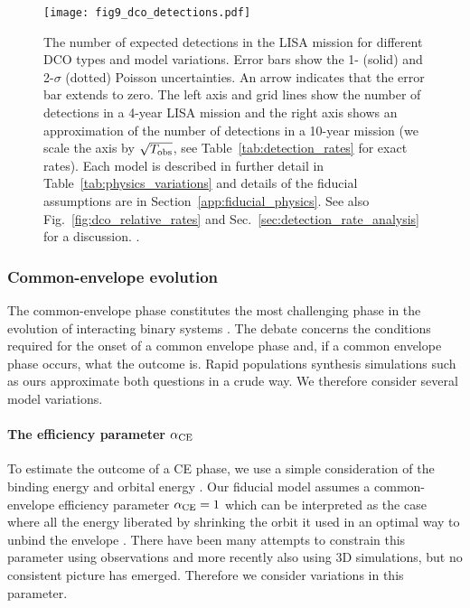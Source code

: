 \begin{figure*}[p]
    \centering
    \texttt{[image: fig9\_dco\_detections.pdf]}
    \caption{The number of expected detections in the LISA mission for different DCO types and model variations. Error bars show the 1- (solid) and 2-$\sigma$ (dotted) Poisson uncertainties. An arrow indicates that the error bar extends to zero. The left axis and grid lines show the number of detections in a 4-year LISA mission and the right axis shows an approximation of the number of detections in a 10-year mission (we scale the axis by $\sqrt{T_{\rm obs}}$, see Table~\ref{tab:detection_rates} for exact rates). Each model is described in further detail in Table~\ref{tab:physics_variations} and details of the fiducial assumptions are in Section~\ref{app:fiducial_physics}. See also Fig.~\ref{fig:dco_relative_rates} and Sec.~\ref{sec:detection_rate_analysis} for a discussion. \href{https://github.com/TomWagg/detecting-DCOs-in-LISA/blob/main/paper/figures/fig9_dco_detections.pdf}{\faFileImage} \href{https://github.com/TomWagg/detecting-DCOs-in-LISA/blob/main/paper/figure_notebooks/detections.ipynb}{\faBook}.}
    \label{fig:detection_rates}
\end{figure*}

\subsubsection{Common-envelope evolution}\label{sec:detection_rate_CE_trends}

The common-envelope phase constitutes the most challenging phase in the evolution of interacting binary systems \citep{Ivanova+2013}. The debate concerns the conditions required for the onset of a common envelope phase and, if a common envelope phase occurs, what the outcome is. Rapid populations synthesis simulations such as ours approximate both questions in a crude way. We therefore consider several model variations. 

\paragraph{The efficiency parameter $\alpha_{\rm CE}$} To estimate the outcome of a CE phase, we use a simple consideration of the binding energy and orbital energy  \citep{Webbink+1984}. Our fiducial model assumes a common-envelope efficiency parameter $\alpha_{\rm CE} = 1$ which can be interpreted as the case where all the energy liberated by shrinking the orbit it used in an optimal way to unbind the envelope \citep{Webbink+1984}. There have been many attempts to constrain this parameter using observations and more recently also using 3D simulations, but no consistent picture has emerged. Therefore we consider variations in this parameter. 


